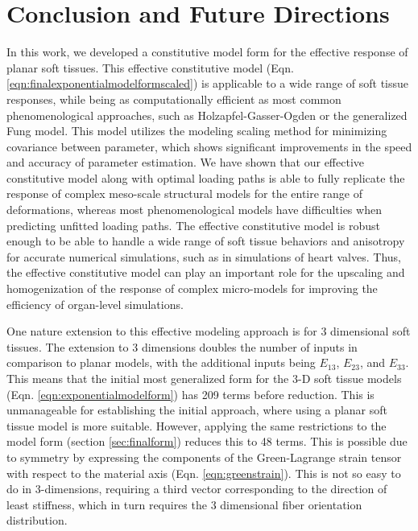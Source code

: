 \section{Conclusion and Future Directions} 

	In this work, we developed a constitutive model form for the effective response of planar soft tissues. This effective constitutive model (Eqn. \ref{eqn:finalexponentialmodelformscaled}) is applicable to a wide range of soft tissue responses, while being as computationally efficient as most common phenomenological approaches, such as Holzapfel-Gasser-Ogden or the generalized Fung model. This model utilizes the modeling scaling method for minimizing covariance between parameter, which shows significant improvements in the speed and accuracy of parameter estimation. We have shown that our effective constitutive model along with optimal loading paths is able to fully replicate the response of complex meso-scale structural models for the entire range of deformations, whereas most phenomenological models have difficulties when predicting unfitted loading paths. The effective constitutive model is robust enough to be able to handle a wide range of soft tissue behaviors and anisotropy for accurate numerical simulations, such as in simulations of heart valves. Thus, the effective constitutive model can play an important role for the upscaling and homogenization of the response of complex micro-models for improving the efficiency of organ-level simulations. 
    

	One nature extension to this effective modeling approach is for 3 dimensional soft tissues. The extension to 3 dimensions doubles the number of inputs in comparison to planar models, with the additional inputs being $E_{13}$, $E_{23}$, and $E_{33}$. This means that the initial most generalized form for the 3-D soft tissue models (Eqn. \ref{eqn:exponentialmodelform}) has 209 terms before reduction. This is unmanageable for establishing the initial approach, where using a planar soft tissue model is more suitable. However, applying the same restrictions to the model form (section \ref{sec:finalform}) reduces this to 48 terms. This is possible due to symmetry by expressing the components of the Green-Lagrange strain tensor with respect to the material axis (Eqn. \ref{eqn:greenstrain}). This is not so easy to do in 3-dimensions, requiring a third vector corresponding to the direction of least stiffness, which in turn requires the 3 dimensional fiber orientation distribution. 
    
    
    
    
    
    
    
    
